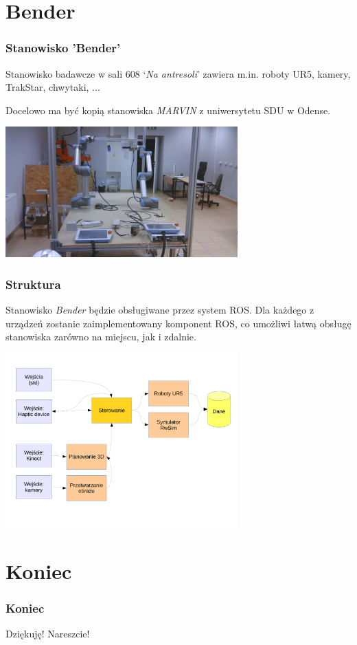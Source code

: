 \documentclass[12pt,a4paper,portrait]{beamer}
\begin{document}
\section{Bender}
\begin{frame}
\frametitle{Stanowisko 'Bender'}
Stanowisko badawcze w sali 608 `\textit{Na antresoli}' zawiera m.in. roboty UR5, kamery, TrakStar, chwytaki, ...


Docelowo ma być kopią stanowiska \textit{MARVIN} z uniwersytetu SDU w Odense.

\begin{center}
\includegraphics[width=0.67\textwidth]{pics/bender}
\end{center}
\end{frame}

\begin{frame}
\frametitle{Struktura}
Stanowisko \textit{Bender} będzie obsługiwane przez system ROS. Dla każdego z urządzeń zostanie zaimplementowany komponent ROS, co umożliwi łatwą obsługę stanowiska zarówno na miejscu, jak i zdalnie.

\begin{center}
\includegraphics[width=0.67\textwidth]{pics/struktura.pdf}
\end{center}
\end{frame}



\section{Koniec}
\begin{frame}
\frametitle{Koniec}
Dziękuję! Nareszcie!
\end{frame}
\end{document}

